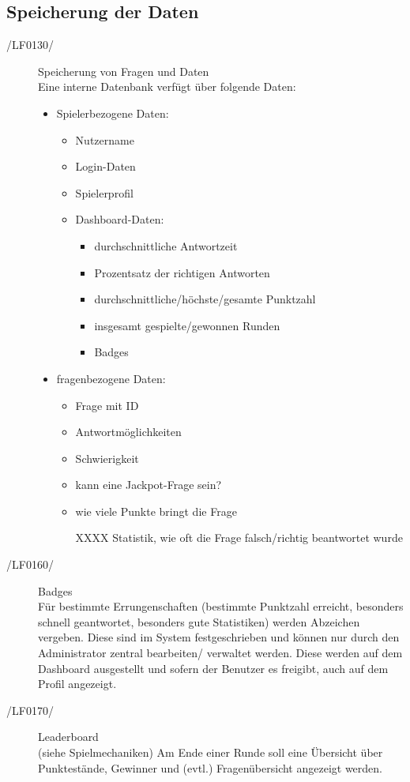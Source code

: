 \documentclass[11pt,a4paper]{scrreprt}
\begin{document}
\subsection{Speicherung der Daten}
\begin{description}
\item[/LF0130/] Speicherung von Fragen und Daten \\
Eine interne Datenbank verfügt über folgende Daten:
	\begin{itemize}
	\item Spielerbezogene Daten:
		\begin{itemize}
		\item Nutzername
		\item Login-Daten
		\item Spielerprofil
		\item Dashboard-Daten:
			\begin{itemize}
			\item durchschnittliche Antwortzeit
			\item Prozentsatz der richtigen Antworten
			\item durchschnittliche/höchste/gesamte Punktzahl
			\item insgesamt gespielte/gewonnen Runden
			\item Badges
			\end{itemize}
		\end{itemize}
	\item fragenbezogene Daten:
		\begin{itemize}
		\item Frage mit ID
		\item Antwortmöglichkeiten
		\item Schwierigkeit
		\item kann eine Jackpot-Frage sein?
		\item wie viele Punkte bringt die Frage
		\item[XXXX] Statistik, wie oft die Frage falsch/richtig beantwortet wurde
		\end{itemize}
	\end{itemize}
\end{description}

\begin{description}
\item[/LF0160/] Badges \\
Für bestimmte Errungenschaften (bestimmte Punktzahl erreicht, besonders schnell geantwortet, besonders gute Statistiken) werden Abzeichen vergeben. Diese sind im System festgeschrieben und können nur durch den Administrator zentral bearbeiten/ verwaltet werden. Diese werden auf dem Dashboard ausgestellt und sofern der Benutzer es freigibt, auch auf dem Profil angezeigt.
\item[/LF0170/] Leaderboard \\
(siehe Spielmechaniken) Am Ende einer Runde soll eine Übersicht über Punktestände, Gewinner und (evtl.) Fragenübersicht angezeigt werden.
\end{description}
\end{document}
